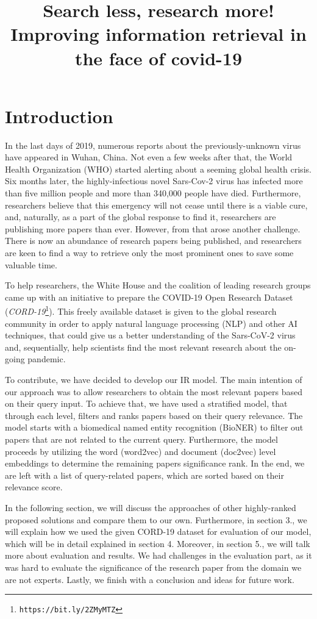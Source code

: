 \documentclass[10pt, a4paper]{article}
\title{
Search less, research more!\\
Improving information retrieval in the face of covid-19\\
}
\begin{document}
\maketitleabstract

\section{Introduction}

In the last days of 2019, numerous reports about the previously-unknown virus have appeared in Wuhan, China. Not even a few weeks after that, the World Health Organization (WHO) started alerting about a seeming global health crisis. Six months later, the highly-infectious novel Sars-Cov-2 virus has infected more than five million people and more than 340,000 people have died. Furthermore, researchers believe that this emergency will not cease until there is a viable cure, and, naturally, as a part of the global response to find it, researchers are publishing more papers than ever. However, from that arose another challenge. There is now an abundance of research papers being published, and researchers are keen to find a way to retrieve only the most prominent ones to save some valuable time.

To help researchers, the White House and the coalition of leading research groups came up with an initiative to prepare the COVID-19 Open Research Dataset (\emph{CORD-19}\footnote{\texttt{https://bit.ly/2ZMyMTZ}}). This freely available dataset is given to the global research community in order to apply natural language processing (NLP) and other AI techniques, that could give us a better understanding of the Sars-CoV-2 virus and, sequentially, help scientists find the most relevant research about the on-going pandemic.

To contribute, we have decided to develop our IR model. The main intention of our approach was to allow researchers to obtain the most relevant papers based on their query input. To achieve that, we have used a stratified model, that through each level, filters and ranks papers based on their query relevance.  The model starts with a biomedical named entity recognition (BioNER) to filter out papers that are not related to the current query. Furthermore, the model proceeds by utilizing the word (word2vec) and document (doc2vec) level embeddings to determine the remaining papers significance rank. In the end, we are left with a list of query-related papers, which are sorted based on their relevance score.

In the following section, we will discuss the approaches of other highly-ranked proposed solutions and compare them to our own. Furthermore, in section 3., we will explain how we used the given CORD-19 dataset for evaluation of our model, which will be in detail explained in section 4. Moreover, in section 5., we will talk more about evaluation and results.  We had challenges in the evaluation part, as it was hard to evaluate the significance of the research paper from the domain we are not experts. Lastly, we finish with a conclusion and ideas for future work.
\end{document}
